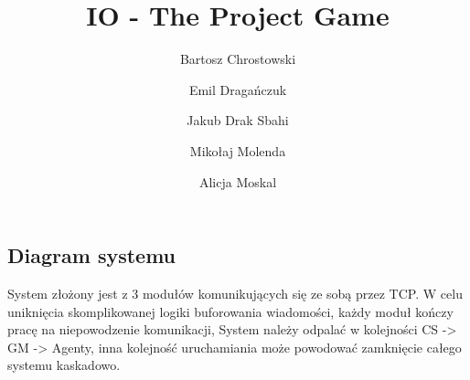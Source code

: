 \documentclass[a4paper]{article}
\title{IO - The Project Game}
\author{Bartosz Chrostowski
        \and Emil Dragańczuk
        \and Jakub Drak Sbahi
        \and Mikołaj Molenda
        \and Alicja Moskal}
\date{}
\begin{document}
\maketitle
\newpage
\tableofcontents
\newpage

\newpage


\begin{samepage}
        \newpage
        \section{Diagram systemu}
        System złożony jest z 3 modułów komunikujących się ze sobą przez TCP.
        W celu uniknięcia skomplikowanej logiki buforowania wiadomości, każdy moduł kończy pracę na niepowodzenie komunikacji,
        System należy odpalać w kolejności CS -> GM -> Agenty, inna kolejność uruchamiania może powodować zamknięcie całego systemu kaskadowo.
\end{samepage}







\end{document}
